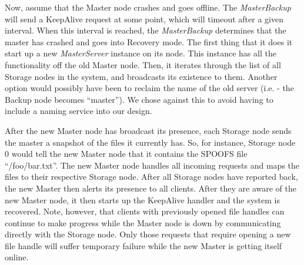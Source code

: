 Now, assume that the Master node crashes and goes offline.  The \textit{MasterBackup} will send a KeepAlive request at some point, which will timeout after a given interval.  When this interval is reached, the \textit{MasterBackup} determines that the master has crashed and goes into Recovery mode.  The first thing that it does it start up a new \textit{MasterServer} instance on its node.  This instance has all the functionality off the old Master node.  Then, it iterates through the list of all Storage nodes in the system, and broadcasts its existence to them.  Another option would possibly have been to reclaim the name of the old server (i.e. - the Backup node becomes ``master'').  We chose against this to avoid having to include a naming service into our design.

After the new Master node has broadcast its presence, each Storage node sends the master a snapshot of the files it currently has.  So, for instance, Storage node 0 would tell the new Master node that it contains the SPOOFS file ``/foo/bar.txt''.  The new Master node handles all incoming requests and maps the files to their respective Storage node.  After all Storage nodes have reported back, the new Master then alerts its presence to all clients.  After they are aware of the new Master node, it then starts up the KeepAlive handler and the system is recovered.  Note, however, that clients with previously opened file handles can continue to make progress while the Master node is down by communicating directly with the Storage node.  Only those requests that require opening a new file handle will suffer temporary failure while the new Master is getting itself online.
